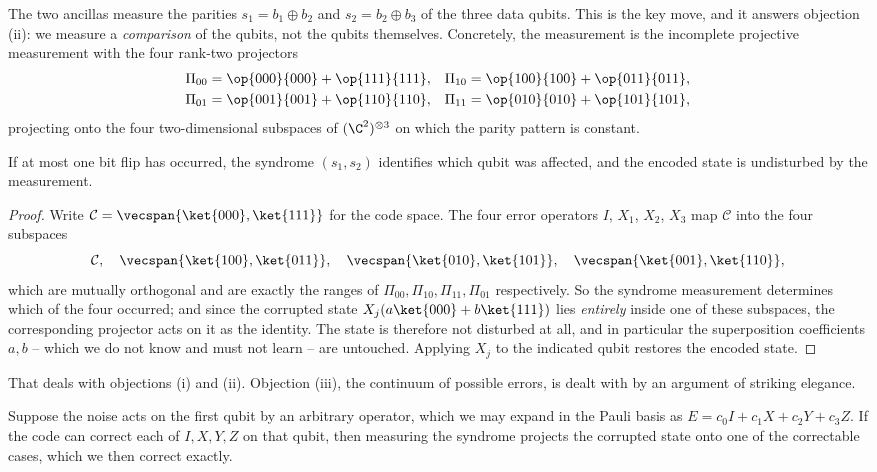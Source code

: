 The two ancillas measure the parities $s_1 = b_1\oplus b_2$ and $s_2 = b_2\oplus b_3$ of the three data qubits. This is the key move, and it answers objection (ii): we measure a \emph{comparison} of the qubits, not the qubits themselves. Concretely, the measurement is the incomplete projective measurement with the four rank-two projectors
\begin{align*}
	\Pi_{00} &= \op{000}{000}+\op{111}{111}, & \Pi_{10} &= \op{100}{100}+\op{011}{011},\\
	\Pi_{01} &= \op{001}{001}+\op{110}{110}, & \Pi_{11} &= \op{010}{010}+\op{101}{101},
\end{align*}
projecting onto the four two-dimensional subspaces of $(\C^2)^{\otimes3}$ on which the parity pattern is constant.

\begin{proposition}
	If at most one bit flip has occurred, the syndrome $(s_1,s_2)$ identifies which qubit was affected, and the encoded state is undisturbed by the measurement.
\end{proposition}

\begin{proof}
	Write $\mathcal C = \vecspan\{\ket{000},\ket{111}\}$ for the code space. The four error operators $I$, $X_1$, $X_2$, $X_3$ map $\mathcal C$ into the four subspaces
	$$\mathcal C,\quad \vecspan\{\ket{100},\ket{011}\},\quad\vecspan\{\ket{010},\ket{101}\},\quad\vecspan\{\ket{001},\ket{110}\},$$
	which are mutually orthogonal and are exactly the ranges of $\Pi_{00},\Pi_{10},\Pi_{11},\Pi_{01}$ respectively. So the syndrome measurement determines which of the four occurred; and since the corrupted state $X_j(a\ket{000}+b\ket{111})$ lies \emph{entirely} inside one of these subspaces, the corresponding projector acts on it as the identity. The state is therefore not disturbed at all, and in particular the superposition coefficients $a,b$ -- which we do not know and must not learn -- are untouched. Applying $X_j$ to the indicated qubit restores the encoded state.
\end{proof}

That deals with objections (i) and (ii). Objection (iii), the continuum of possible errors, is dealt with by an argument of striking elegance.

\begin{proposition}
	Suppose the noise acts on the first qubit by an arbitrary operator, which we may expand in the Pauli basis as $E = c_0I+c_1X+c_2Y+c_3Z$. If the code can correct each of $I,X,Y,Z$ on that qubit, then measuring the syndrome projects the corrupted state onto one of the correctable cases, which we then correct exactly.
\end{proposition}

